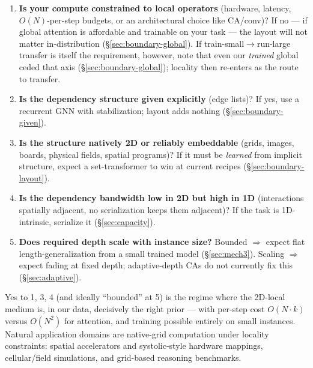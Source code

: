 \documentclass[11pt]{article}
\begin{document}
\begin{enumerate}
\item \textbf{Is your compute constrained to local operators} (hardware,
  latency, $O(N)$-per-step budgets, or an architectural choice like
  CA/conv)? If no --- if global attention is affordable and trainable on your
  task --- the layout will not matter in-distribution
  (\S\ref{sec:boundary-global}). If train-small$\to$run-large transfer is
  itself the requirement, however, note that even our \emph{trained} global
  ceded that axis (\S\ref{sec:boundary-global}); locality then re-enters as
  the route to transfer.
\item \textbf{Is the dependency structure given explicitly} (edge lists)? If
  yes, use a recurrent GNN with stabilization; layout adds nothing
  (\S\ref{sec:boundary-given}).
\item \textbf{Is the structure natively 2D or reliably embeddable} (grids,
  images, boards, physical fields, spatial programs)? If it must be
  \emph{learned} from implicit structure, expect a set-transformer to win at
  current recipes (\S\ref{sec:boundary-layout}).
\item \textbf{Is the dependency bandwidth low in 2D but high in 1D}
  (interactions spatially adjacent, no serialization keeps them adjacent)?
  If the task is 1D-intrinsic, serialize it (\S\ref{sec:capacity}).
\item \textbf{Does required depth scale with instance size?} Bounded
  $\Rightarrow$ expect flat length-generalization from a small trained model
  (\S\ref{sec:mech3}). Scaling $\Rightarrow$ expect fading at fixed depth;
  adaptive-depth CAs do not currently fix this (\S\ref{sec:adaptive}).
\end{enumerate}

Yes to 1, 3, 4 (and ideally ``bounded'' at 5) is the regime where the
2D-local medium is, in our data, decisively the right prior --- with per-step
cost $O(N \cdot k)$ versus $O(N^2)$ for attention, and training possible
entirely on small instances. Natural application domains are native-grid
computation under locality constraints: spatial accelerators and
systolic-style hardware mappings, cellular/field simulations, and grid-based
reasoning benchmarks.
\end{document}

